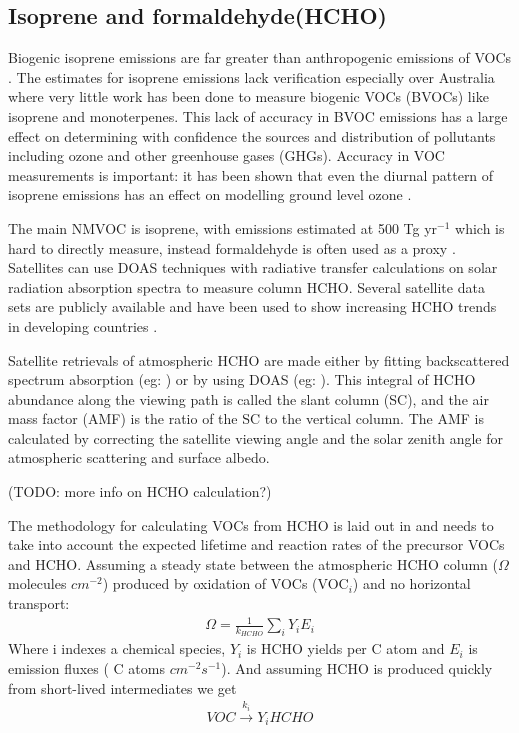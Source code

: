 \subsection{Isoprene and formaldehyde(HCHO)}

Biogenic isoprene emissions are far greater than anthropogenic emissions of VOCs \cite{Guenther_2006}. 
The estimates for isoprene emissions lack verification especially over Australia where very little work has been done to measure biogenic VOCs (BVOCs) like isoprene and monoterpenes.
This lack of accuracy in BVOC emissions has a large effect on determining with confidence the sources and distribution of pollutants including ozone and other greenhouse gases (GHGs).
Accuracy in VOC measurements is important: it has been shown that even the diurnal pattern of isoprene emissions has an effect on modelling ground level ozone \cite{Hewitt_2011}.

The main NMVOC is isoprene, with emissions estimated at 500 Tg yr$^{-1}$ \cite{Guenther_2006} which is hard to directly measure, instead formaldehyde is often used as a proxy \cite{Marais_2012,bauwens2013satellite}.
Satellites can use DOAS techniques with radiative transfer calculations on solar radiation absorption spectra to measure column HCHO.
Several satellite data sets are publicly available and have been used to show increasing HCHO trends in developing countries \cite{Mahajan_2015}.

Satellite retrievals of atmospheric HCHO are made either by fitting backscattered spectrum absorption (eg: \citet{Chance_2000}) or by using DOAS (eg: \cite{Leue_2001}).
This integral of HCHO abundance along the viewing path is called the slant column (SC), and the air mass factor (AMF) is the ratio of the SC to the vertical column.
The AMF is calculated by correcting the satellite viewing angle and the solar zenith angle for atmospheric scattering and surface albedo.

(TODO: more info on HCHO calculation?)

The methodology for calculating VOCs from HCHO is laid out in \citet{Palmer_2003} and needs to take into account the expected lifetime and reaction rates of the precursor VOCs and HCHO.
Assuming a steady state between the atmospheric HCHO column ($\Omega$ molecules $cm^{-2}$)  produced by oxidation of VOCs (VOC$_i$) and no horizontal transport:
\begin{eqnarray*}
\Omega = \frac{1}{k_{HCHO}} \sum_{i} Y_i E_i
\end{eqnarray*}
Where i indexes a chemical species, $Y_i$ is HCHO yields per C atom and $E_i$ is emission fluxes ( C atoms $cm^{-2}s^{-1}$).
And assuming HCHO is produced quickly from short-lived intermediates we get
\begin{eqnarray*}
VOC \overset{k_i}{\rightarrow} Y_i HCHO
\end{eqnarray*}


